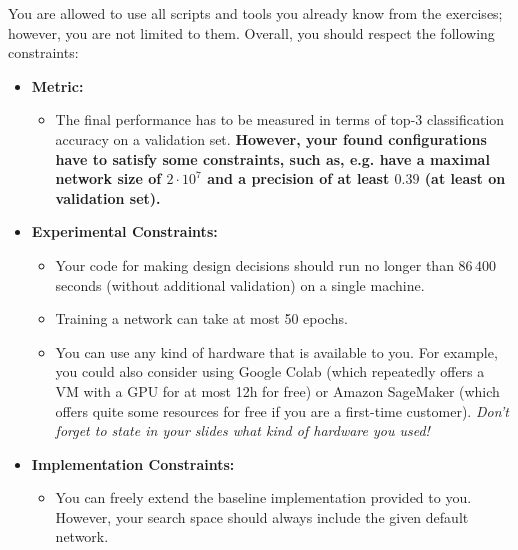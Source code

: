\documentclass[10pt,a4paper]{article}
\begin{document}
		\newpage
		\noindent		
		You are allowed to use all scripts and tools you already know from the exercises; however, you are not limited to them.
		Overall, you should respect the following constraints:
		\begin{itemize}
			\item \textbf{Metric:}
			\begin{itemize}
				\item The final performance has to be measured in terms of top-3 classification accuracy on a validation set.
				\textbf{However, your found configurations have to satisfy some constraints, such as, e.g. have a maximal network size of $2\cdot 10^7$ and a precision of at least $0.39$ (at least on validation set).}
			\end{itemize}
			\item \textbf{Experimental Constraints:}
			\begin{itemize}
				\item Your code for making design decisions should run no longer than $86\,400$ seconds (without additional validation) on a single machine.
				\item Training a network can take at most 50 epochs.
				\item You can use any kind of hardware that is available to you. For example, you could also consider using Google Colab (which repeatedly offers a VM with a GPU for at most 12h for free) or Amazon SageMaker (which offers quite some resources for free if you are a first-time customer). \textit{Don't forget to state in your slides what kind of hardware you used!}
			\end{itemize}
			\item \textbf{Implementation Constraints:}
			\begin{itemize}
			  \item You can freely extend the baseline implementation provided to you. However, your search space should always include the given default network.

\end{itemize}
\end{itemize}
\end{document}
